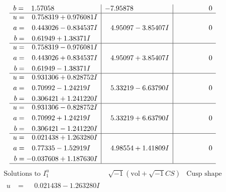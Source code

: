 \documentclass[1p]{elsarticle_modified}
\theoremstyle{definition}
\newcommand{\I}{\sqrt{-1}}
\begin{document}
$$\begin{array}{c|c|c}
\begin{aligned}
b &= \phantom{-}1.57058\phantom{ +0.000000I}\end{aligned}
 & -7.95878\phantom{ +0.000000I} & \phantom{-0.000000 } 0 \\ \hline\begin{aligned}
u &= \phantom{-}0.758319 + 0.976081 I \\
a &= \phantom{-}0.443026 - 0.834537 I \\
b &= \phantom{-}0.61949 + 1.38371 I\end{aligned}
 & \phantom{-}4.95097 - 3.85407 I & \phantom{-0.000000 } 0 \\ \hline\begin{aligned}
u &= \phantom{-}0.758319 - 0.976081 I \\
a &= \phantom{-}0.443026 + 0.834537 I \\
b &= \phantom{-}0.61949 - 1.38371 I\end{aligned}
 & \phantom{-}4.95097 + 3.85407 I & \phantom{-0.000000 } 0 \\ \hline\begin{aligned}
u &= \phantom{-}0.931306 + 0.828752 I \\
a &= \phantom{-}0.70992 - 1.24219 I \\
b &= \phantom{-}0.306421 + 1.241220 I\end{aligned}
 & \phantom{-}5.33219 - 6.63790 I & \phantom{-0.000000 } 0 \\ \hline\begin{aligned}
u &= \phantom{-}0.931306 - 0.828752 I \\
a &= \phantom{-}0.70992 + 1.24219 I \\
b &= \phantom{-}0.306421 - 1.241220 I\end{aligned}
 & \phantom{-}5.33219 + 6.63790 I & \phantom{-0.000000 } 0 \\ \hline\begin{aligned}
u &= \phantom{-}0.021438 + 1.263280 I \\
a &= \phantom{-}0.77335 - 1.52919 I \\
b &= -0.037608 + 1.187630 I\end{aligned}
 & \phantom{-}4.98554 + 1.41809 I & \phantom{-0.000000 } 0\\
 \hline 
 \end{array}$$\newpage$$\begin{array}{c|c|c}  
\text{Solutions to }I^u_{1}& \I (\text{vol} + \sqrt{-1}CS) & \text{Cusp shape}\\
 \hline 
\begin{aligned}
u &= \phantom{-}0.021438 - 1.263280 I \\

\end{aligned}
\end{array}$$
\end{document}
